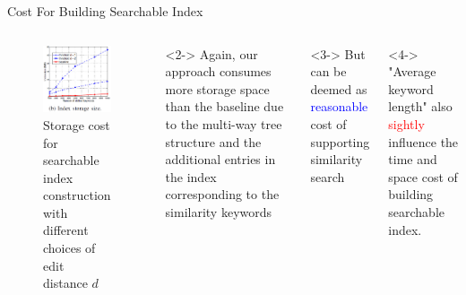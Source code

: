 \documentclass[handout]{beamer}
\begin{document}
\begin{frame}{Cost For Building Searchable Index}
	\begin{columns}
	\begin{figure}
		\includegraphics[width=\textwidth]{subfig3.jpg}
		\caption{Storage cost for searchable index construction with different choices of edit distance $d$}	
	\end{figure}
	\begin{exampleblock}<2->{}
		Again, our approach consumes more storage space than the baseline due to the \textcolor[rgb]{0.1,0.7,0.2}{multi-way tree structure} and the \textcolor[rgb]{0.1,0.7,0.2}{additional entries} in the index corresponding to the similarity keywords
	\end{exampleblock}
	\begin{block}<3->{}
		But can be deemed as \textcolor{blue}{reasonable} cost of supporting similarity search
	\end{block}
	\begin{alertblock}<4->{}
		"Average keyword length" also \textcolor{red}{sightly} influence the time and space cost of building searchable index.
	\end{alertblock}
	\end{columns}
\end{frame}
\end{document}
